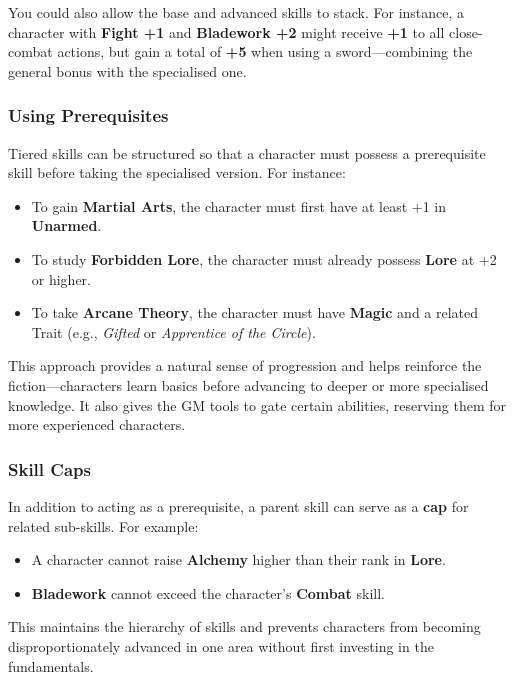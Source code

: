 You could also allow the base and advanced skills to stack. For instance, a character with \textbf{Fight +1} and \textbf{Bladework +2} might receive \textbf{+1} to all close-combat actions, but gain a total of \textbf{+5} when using a sword—combining the general bonus with the specialised one.

\subsubsection*{Using Prerequisites}

Tiered skills can be structured so that a character must possess a prerequisite skill before taking the specialised version. For instance:

\begin{itemize}
    \item To gain \textbf{Martial Arts}, the character must first have at least +1 in \textbf{Unarmed}.
    \item To study \textbf{Forbidden Lore}, the character must already possess \textbf{Lore} at +2 or higher.
    \item To take \textbf{Arcane Theory}, the character must have \textbf{Magic} and a related Trait (e.g., \textit{Gifted} or \textit{Apprentice of the Circle}).
\end{itemize}

This approach provides a natural sense of progression and helps reinforce the fiction—characters learn basics before advancing to deeper or more specialised knowledge. It also gives the GM tools to gate certain abilities, reserving them for more experienced characters.


\subsubsection*{Skill Caps}

In addition to acting as a prerequisite, a parent skill can serve as a \textbf{cap} for related sub-skills. For example:

\begin{itemize}
    \item A character cannot raise \textbf{Alchemy} higher than their rank in \textbf{Lore}.
    \item \textbf{Bladework} cannot exceed the character’s \textbf{Combat} skill.
\end{itemize}

This maintains the hierarchy of skills and prevents characters from becoming disproportionately advanced in one area without first investing in the fundamentals.

